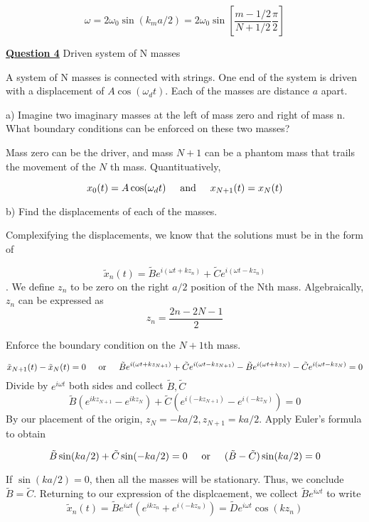 \documentclass{article}
\newcommand{\new}[1]{
    \vspace{2mm}
    \noindent
    \textbf{
    \underline{#1}}
}
\newcommand{\textOr}{
    {
        \hspace{5mm}
        \textrm{or}
        \hspace{5mm}
    }
}
\newcommand{\textAnd}{
    {
        \hspace{5mm}
        \textrm{and}
        \hspace{5mm}
    }
}
\newcommand{\Ixp}[1]{
    {
        e^{i{#1}}
    }
}
\begin{document}
\[
    \boxed{
    \omega = 2\omega_0 \sin(k_m a/2) = 2\omega_0 \sin \left[
        \frac{m - 1/2}{N + 1/2} \frac{\pi}{2}
    \right]
    }
\]


\newpage

\new{Question 4} Driven system of N masses

A system of N masses is connected with strings. One end of the system 
is driven with a displacement of $A\cos(\omega_d t)$. Each of the masses 
are distance $a$ apart. 

\noindent
a) Imagine two imaginary masses at the left of mass zero and right of mass 
n. What boundary conditions can be enforced on these two masses?

Mass zero can be the driver, and mass $N+1$ can be a phantom mass 
that trails the movement of the $N$ th mass. Quantituatively, 

\[
    x_0(t) = A\cos(\omega_d t)
    \textAnd 
    x_{N+1}(t) = x_{N}(t)
\]

\noindent 
b) Find the displacements of each of the masses. 

Complexifying the displacements, we know that the 
solutions must be in the form of 

\[
    \tilde{x}_n(t) = 
    \tilde{B}\Ixp{(\omega t + k z_n)} +
    \tilde{C}\Ixp{(\omega t - k z_n)}
\]. 
We define $z_n$ to be zero on the right $a/2$ position of 
the Nth mass. Algebraically, $z_n$ can be expressed as 
\[
    z_n = \frac{2n - 2N - 1}{2}
\]

Enforce the boundary condition on the $N+1$th mass. 

\[
    \tilde{x}_{N + 1}(t) - \tilde{x}_{N}(t) = 0 
    \textOr 
     \tilde{B}\Ixp{(\omega t + k z_{N + 1})} +
    \tilde{C}\Ixp{(\omega t - k z_{N + 1})}
    -
 \tilde{B}\Ixp{(\omega t + k z_N )} -
    \tilde{C}\Ixp{(\omega t - k z_N)}
    = 0
\]
Divide by $\Ixp{\omega t}$ both sides and collect 
$\tilde{B}, \tilde{C}$
\[
    \tilde{B} (\Ixp{kz_{N + 1}} - \Ixp{kz_{N}})
    + \tilde{C}(
        \Ixp{(-kz_{N + 1})}
    - \Ixp{(-kz_N)}
    )
    = 0
\]
By our placement of the origin, $z_N = -ka/2, z_{N+1} = ka/2$. 
Apply Euler's formula to obtain 

\[
   \tilde{B}\sin(ka/2) + \tilde{C}\sin(-ka/2) = 0 
   \textOr 
   (\tilde{B} - \tilde{C}) \sin(ka/2) = 0
\]

If $\sin(ka/2) = 0$, then all the masses will be stationary. Thus, 
we conclude $\tilde{B} = \tilde{C}$. Returning to our expression of 
the displcaement, we collect $\tilde{B}\Ixp{\omega t}$ to write 
\[
    \boxed{
    \tilde{x}_n(t) = \tilde{B}\Ixp{\omega t} (\Ixp{kz_n} + \Ixp{(-kz_n)})
    = \tilde{D} \Ixp{\omega t}\cos(kz_n)
    }
\]
\end{document}
